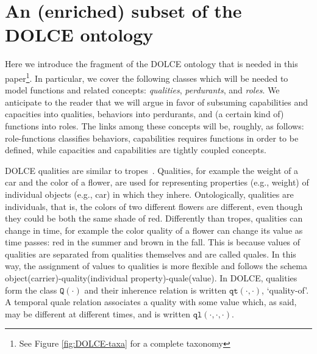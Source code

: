 \documentclass[sw]{iosart2x}
\newcommand{\generalStyle}[1]{\texttt{#1}}
\newcommand{\biRel}[3]{\generalStyle{#1}(#2,#3)}
\newcommand{\uniRel}[2]{\generalStyle{#1}(#2)}
\newcommand{\triRel}[4]{\generalStyle{#1}(#2,#3,#4)}
\newcommand{\DOLCE}{\textsc{DOLCE}\xspace} %
\newcommand{\DOLCEQuality}[1]{\uniRel{Q}{#1}}
\newcommand{\DOLCEQualityDirect}[2]{\biRel{qt}{#1}{#2}}
\newcommand{\DOLCEQualeDirectTer}[3]{\triRel{{ql}}{#1}{#2}{#3}}
\newcommand{\firstTimeKeyWord}[1]{\textit{#1}}
\newcommand{\quotes}[1]{`#1'}
\begin{document}
\section{An (enriched) subset of the \DOLCE ontology\label{sec:DOLCE}} 
Here we introduce the fragment of the \DOLCE ontology \cite{masoloWonderWebDeliverableD182003,borgoDOLCEDescriptiveOntology2022} that is needed in this paper\footnote{See Figure \ref{fig:DOLCE-taxa} for a complete taxonomy}. In particular, we cover the following classes which will be needed to model functions and related concepts: \firstTimeKeyWord{qualities}, \firstTimeKeyWord{perdurants}, and \firstTimeKeyWord{roles}. 
We anticipate to the reader that we will argue in favor of subsuming capabilities and capacities into qualities, behaviors into perdurants, and (a certain kind of) functions into roles. The links among these concepts will be, roughly, as follows: role-functions classifies behaviors, capabilities requires functions in order to be defined, while capacities and capabilities are tightly coupled concepts.  

\DOLCE qualities are similar to tropes~\cite{Campbell90}. Qualities, for example the weight of a car and the color of a flower, are used for representing properties (e.g., weight) of individual objects (e.g., car) in which they inhere.
Ontologically, qualities are individuals, that is, the colors of two different flowers are different, even though they could be both the same shade of red.
Differently than tropes, qualities can change in time, for example the color quality of a flower can change its value as time passes: red in the summer and brown in the fall.
This is because values of qualities are separated from qualities themselves and are called quales. 
In this way, the assignment of values to qualities is more flexible and follows the schema object(carrier)-quality(individual property)-quale(value).
In \DOLCE, qualities form the class $\DOLCEQuality{\cdot}$ and their inherence relation is written $\DOLCEQualityDirect{\cdot}{\cdot}$, \quotes{quality-of}. A temporal quale relation associates a quality with some value which, as said, may be different at different times, and is written $\DOLCEQualeDirectTer{\cdot}{\cdot}{\cdot}$.%
\end{document}
